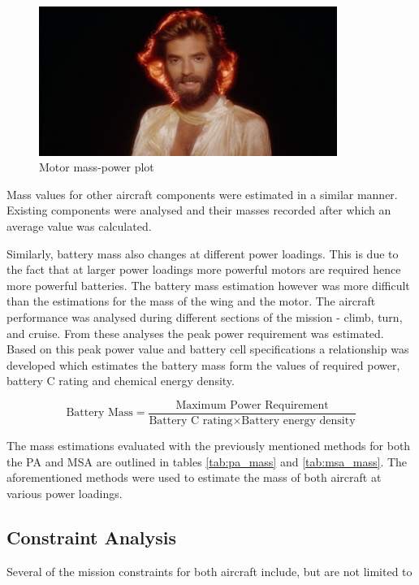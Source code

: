 \begin{figure}[H]
    \centering
    \includegraphics[width=9.72cm]{./preliminary_design/fig/dummy}
    \caption{Motor mass-power plot}
    \label{fig: motor_mp}
\end{figure}


Mass values for other aircraft components were estimated in a similar manner. Existing components were analysed and their masses recorded after which an average value was calculated.

Similarly, battery mass also changes at different power loadings. This is due to the fact that at larger power loadings more powerful motors are required hence more powerful batteries. The battery mass estimation however was more difficult than the estimations for the mass of the wing and the motor. The aircraft performance was analysed during different sections of the mission - climb, turn, and cruise. From these analyses the peak power requirement was estimated. Based on this peak power value and battery cell specifications a relationship was developed which estimates the battery mass form the values of required power, battery C rating and chemical energy density.

\begin{equation}
    \text{Battery Mass} = \frac{\text{Maximum Power Requirement}}{\text{Battery C rating}\times\text{Battery energy density}}
\end{equation}

The mass estimations evaluated with the previously mentioned methods for both the PA and MSA are outlined in tables \ref{tab:pa_mass} and \ref{tab:msa_mass}. The aforementioned methods were used to estimate the mass of both aircraft at various power loadings.





\subsection{Constraint Analysis}
Several of the mission constraints for both aircraft include, but are not limited to 

